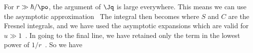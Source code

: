 {	For $r \gg \hbar / \po$, the argument of $\Jq$ is large everywhere.  This means we can use the asymptotic approximation~\cite{Bessel}
	The integral then becomes
	where $S$ and $C$ are the Fresnel integrals, and we have used the asymptotic expansions
	which are valid for $u \gg 1$~\cite{Fresnel}.  In going to the final line, we have retained only the term in the lowest power of $1 / r$~\cite[p.~357]{Landau}.  So we have
	
%	

}
